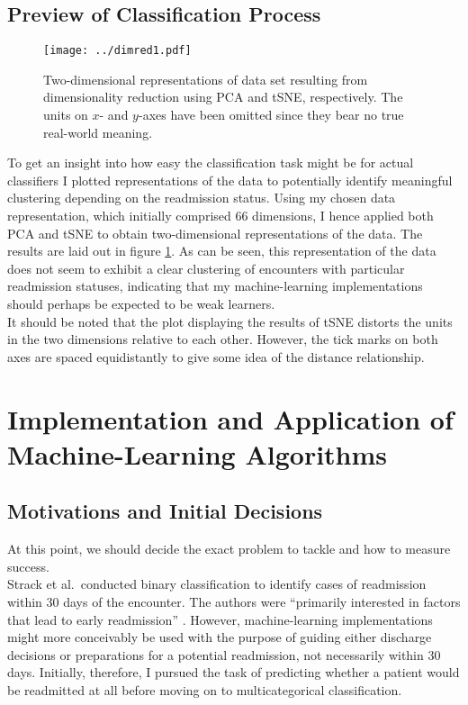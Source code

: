\documentclass[10pt, twoside, a4paper]{article}
\begin{document}
	\subsection{Preview of Classification Process}
	\begin{figure}
	\begin{center}
		\texttt{[image: ../dimred1.pdf]}
		\end{center}
		\caption{Two-dimensional representations of data set resulting from dimensionality 
		reduction using PCA and tSNE, respectively. The units on $x$- and $y$-axes have 
		been omitted since they bear no true real-world meaning.}
		\label{figure:dimred1}
	\end{figure}
	To get an insight into how easy the classification task might be for actual
	classifiers I plotted representations of the data to potentially identify meaningful 
	clustering depending on the readmission status.
	Using my chosen data representation, 
	which initially comprised 66 dimensions, I hence applied both PCA and tSNE to obtain two-dimensional 
	representations of the data. The results are laid out in figure 
	\ref{figure:dimred1}. As can be seen, this representation of the data does not seem to 
	exhibit a clear clustering of encounters with particular readmission statuses, indicating 
	that my machine-learning implementations should perhaps be expected to be weak learners. \\
	It should be noted that the plot displaying the results of tSNE distorts the units in the 
	two dimensions relative to each other. However, the tick marks on both axes are spaced 
	equidistantly to give some idea of the distance relationship. 

	\section{Implementation and Application of Machine-Learning Algorithms}

	\subsection{Motivations and Initial Decisions}
	At this point, we should decide the exact problem to tackle and how to measure success.
	\\
	Strack et al.\ conducted binary classification to identify cases of readmission within 30 
	days of the encounter. The authors were 
	``primarily interested 
	in factors that lead to early readmission'' \cite{Strack2014}. However, machine-learning 
	implementations 
	might more conceivably be used with the purpose of guiding either discharge decisions or 
	preparations for a potential readmission, not necessarily within 30 days. Initially, 
	therefore, I pursued the task of predicting whether a patient would be readmitted 
	at all before moving on to multicategorical classification.
\end{document}
